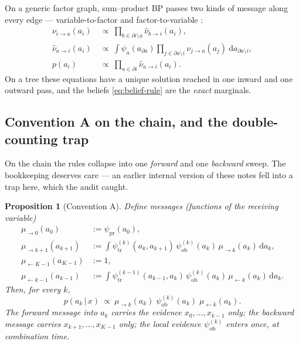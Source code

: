 \documentclass[11pt]{article}
\newtheorem{proposition}{Proposition}
\theoremstyle{definition}
\newcommand{\given}{\,|\,}
\newcommand{\dd}{\mathrm{d}}
\begin{document}
On a generic factor graph, sum--product BP passes two kinds of message along
every edge --- variable-to-factor and factor-to-variable
\citep{mezard2009information,kschischang2001factor,pearl1988probabilistic}:
\begin{align}
  \nu_{i\to a}(a_i)&\ \propto\ \prod_{b\in\partial i\setminus a}\hat\nu_{b\to i}(a_i),
    \label{eq:vp-rule}\\
  \hat\nu_{a\to i}(a_i)&\ \propto\ \int \psi_a(a_{\partial a})
     \prod_{j\in\partial a\setminus i}\nu_{j\to a}(a_j)\ \dd a_{\partial a\setminus i},
    \label{eq:fp-rule}\\
  p(a_i)&\ \propto\ \prod_{a\in\partial i}\hat\nu_{a\to i}(a_i).
    \label{eq:belief-rule}
\end{align}
On a tree these equations have a unique solution reached in one inward and one
outward pass, and the beliefs \eqref{eq:belief-rule} are the \emph{exact}
marginals.

\subsection{Convention A on the chain, and the double-counting trap}

On the chain the rules collapse into one \emph{forward} and one
\emph{backward} sweep. The bookkeeping deserves care --- an earlier internal
version of these notes fell into a trap here, which the audit caught.

\begin{proposition}[Convention A]\label{prop:convA}
Define messages (functions of the receiving variable)
\begin{align}
  \mu_{\to 0}(a_0)&:=\psi_{\mathrm{pr}}(a_0), \label{eq:fwd-init}\\
  \mu_{\to k+1}(a_{k+1})
      &:=\int \psi^{(k)}_{\mathrm{tr}}(a_k,a_{k+1})\,\psi^{(k)}_{\mathrm{ob}}(a_k)\,
               \mu_{\to k}(a_k)\,\dd a_k, \label{eq:fwd-rec}\\
  \mu_{\leftarrow K-1}(a_{K-1})&:=1, \label{eq:bwd-init}\\
  \mu_{\leftarrow k-1}(a_{k-1})
      &:=\int \psi^{(k-1)}_{\mathrm{tr}}(a_{k-1},a_k)\,\psi^{(k)}_{\mathrm{ob}}(a_k)\,
               \mu_{\leftarrow k}(a_k)\,\dd a_k. \label{eq:bwd-rec}
\end{align}
Then, for every $k$,
\begin{equation}\label{eq:combine}
  p(a_k\given x)\ \propto\ \mu_{\to k}(a_k)\;\psi^{(k)}_{\mathrm{ob}}(a_k)\;
  \mu_{\leftarrow k}(a_k).
\end{equation}
The forward message into $a_k$ carries the evidence $x_0,\dots,x_{k-1}$
\emph{only}; the backward message carries $x_{k+1},\dots,x_{K-1}$
\emph{only}; the local evidence $\psi^{(k)}_{\mathrm{ob}}$ enters once, at
combination time.
\end{proposition}
\end{document}
